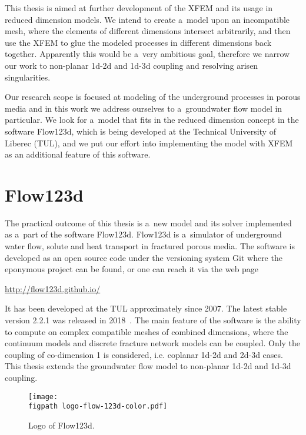 This thesis is aimed at further development of the XFEM and its usage in reduced dimension models. 
We intend to create a~model upon an incompatible mesh, where the elements of different dimensions intersect
arbitrarily, and then use the XFEM to glue the modeled processes in different dimensions back together. 
Apparently this would be a~very ambitious goal, therefore we narrow our work to non-planar 1d-2d and 1d-3d coupling
and resolving arisen singularities. 

Our research scope is focused at modeling of the underground processes in porous media
and in this work we address ourselves to a~groundwater flow model in particular.
We look for a~model that fits in the reduced dimension concept in the software Flow123d, which is being developed at the
Technical University of Liberec (TUL), and we put our effort into implementing the model with XFEM as an additional feature of this software.


\section{Flow123d}
\label{sec:soa_flow123d}

The practical outcome of this thesis is a~new model and its solver implemented as a~part of the software Flow123d.
Flow123d is a~simulator of underground water flow, solute and heat transport in fractured porous media. The software is
developed as an open source code under the versioning system Git where the eponymous project can be found, or 
one can reach it via the web page %
%
\begin{center}
\url{http://flow123d.github.io/}
\end{center}

It has been developed at the TUL approximately since 2007.
The latest stable version 2.2.1 was released in 2018~\cite{flow123d}.
The main feature of the software is the ability to compute on complex compatible meshes of combined dimensions,
where the continuum models and discrete fracture network models can be coupled. Only the coupling of co-dimension 1
is considered, i.e. coplanar 1d-2d and 2d-3d cases.
This thesis extends the groundwater flow model to non-planar 1d-2d and 1d-3d coupling.
%
\begin{figure}[!htb]
  \centering
  \texttt{[image: \\figpath logo-flow-123d-color.pdf]}
  \caption{Logo of Flow123d.}
  \label{fig:logo_flow123d}
\end{figure}

